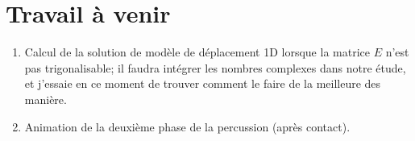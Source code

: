 \documentclass[
  french,
	11pt, %
]{fphw}
\begin{document}

\section*{Travail à venir}

\begin{enumerate}
  \item Calcul de la solution de modèle de déplacement 1D lorsque la matrice $E$ n'est pas trigonalisable; il faudra intégrer les nombres complexes dans notre étude, et j'essaie en ce moment de trouver comment le faire de la meilleure des manière.
  \item Animation de la deuxième phase de la percussion (après contact).
\end{enumerate}



\clearpage   %
\printbibliography
\end{document}
